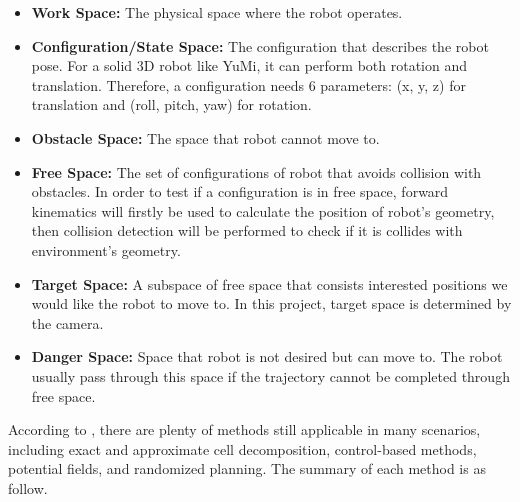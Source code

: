 \begin{itemize}
    \item \textbf{Work Space:} The physical space where the robot operates.
    \item \textbf{Configuration/State Space:} The configuration that describes the robot pose. For a solid 3D robot like YuMi, it can perform both rotation and translation. Therefore, a configuration needs 6 parameters: (x, y, z) for translation and (roll, pitch, yaw) for rotation.
    \item \textbf{Obstacle Space:} The space that robot cannot move to. 
    \item \textbf{Free Space:} The set of configurations of robot that avoids collision with obstacles. In order to test if a configuration is in free space, forward kinematics will firstly be used to calculate the position of robot's geometry, then collision detection will be performed to check if it is collides with environment's geometry.
    \item \textbf{Target Space:} A subspace of free space that consists interested positions we would like the robot to move to. In this project, target space is determined by the camera.
    \item \textbf{Danger Space:} Space that robot is not desired but can move to. The robot usually pass through this space if the trajectory cannot be completed through free space.
\end{itemize}

According to \citep{OMPLPrim20:online}, there are plenty of methods still applicable in many scenarios, including exact and approximate cell decomposition, control-based methods, potential fields, and randomized planning. The summary of each method is as follow.


